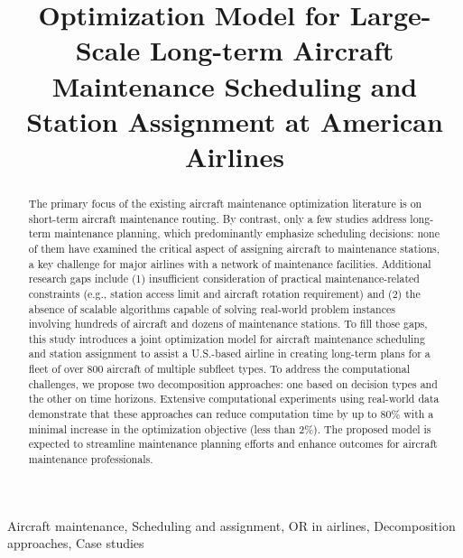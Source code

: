 \documentclass{_main_paper}
\begin{document}
\begin{frontmatter}


\title{Optimization Model for Large-Scale Long-term Aircraft Maintenance Scheduling and Station Assignment at American Airlines}


\address{[Blinded Manuscript]}


% 

\begin{abstract}
The primary focus of the existing aircraft maintenance optimization literature is on short-term aircraft maintenance routing. By contrast, only a few studies address long-term maintenance planning, which predominantly emphasize scheduling decisions: none of them have examined the critical aspect of assigning aircraft to maintenance stations, a key challenge for major airlines with a network of maintenance facilities. Additional research gaps include (1) insufficient consideration of practical maintenance-related constraints (e.g., station access limit and aircraft rotation requirement) and (2) the absence of scalable algorithms capable of solving real-world problem instances involving hundreds of aircraft and dozens of maintenance stations. To fill those gaps, this study introduces a joint optimization model for aircraft maintenance scheduling and station assignment to assist a U.S.-based airline in creating long-term plans for a fleet of over 800 aircraft of multiple subfleet types. To address the computational challenges, we propose two decomposition approaches: one based on decision types and the other on time horizons. Extensive computational experiments using real-world data demonstrate that these approaches can reduce computation time by up to 80\% with a minimal increase in the optimization objective (less than 2\%). The proposed model is expected to streamline maintenance planning efforts and enhance outcomes for aircraft maintenance professionals.
\end{abstract}



\begin{keyword}
Aircraft maintenance, Scheduling and assignment, OR in airlines, Decomposition approaches, Case studies
\end{keyword}

\end{frontmatter}
\end{document}
